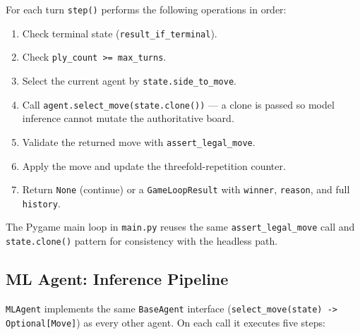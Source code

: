 For each turn \texttt{step()} performs the following operations in order:

\begin{enumerate}
  \item Check terminal state (\texttt{result\_if\_terminal}).
  \item Check \texttt{ply\_count >= max\_turns}.
  \item Select the current agent by \texttt{state.side\_to\_move}.
  \item Call \texttt{agent.select\_move(state.clone())} --- a clone is
        passed so model inference cannot mutate the authoritative board.
  \item Validate the returned move with \texttt{assert\_legal\_move}.
  \item Apply the move and update the threefold-repetition counter.
  \item Return \texttt{None} (continue) or a \texttt{GameLoopResult}
        with \texttt{winner}, \texttt{reason}, and full \texttt{history}.
\end{enumerate}

The Pygame main loop in \texttt{main.py} reuses the same
\texttt{assert\_legal\_move} call and \texttt{state.clone()} pattern
for consistency with the headless path.

\subsection{ML Agent: Inference Pipeline}
\label{sec:inference}

\texttt{MLAgent} implements the same \texttt{BaseAgent} interface
(\texttt{select\_move(state) -> Optional[Move]}) as every other agent.
On each call it executes five steps:

